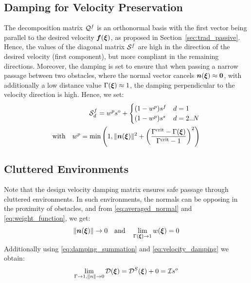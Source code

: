 \subsection{Damping for Velocity Preservation}
The decomposition matrix $\mathcal{Q}^{f}$ is an orthonormal basis with the first vector being parallel to the desired velocity $\boldsymbol{f}(\boldsymbol{\xi})$, as proposed in Section~\ref{sec:trad_passive}. Hence, the values of the diagonal matrix $\mathcal{S}^{f}$ are high in the direction of the desired velocity (first component), but more compliant in the remaining directions. 
Moreover, the damping is set to ensure that when passing a narrow passage between two obstacles, where the normal vector cancels $\boldsymbol{n}(\boldsymbol{\xi}) \approx \boldsymbol{0}$, with additionally a low distance value $\Gamma(\boldsymbol{\xi}) \approx 1$, the damping perpendicular to the velocity direction is high. Hence, we set:
\begin{equation}
  \begin{split}
  \matd{S}^{f}_{d} =
  w^p s^{\mathrm{o}} + 
  \begin{cases}
   (1- w^p) s^f & d = 1 \\
   (1- w^p) s^s & d = 2 .. N 
  \end{cases} \\
  \text{with} \quad
   w^p = \min \left(1,  \| \vecs n(\vecs \xi) \|^2 + \left(\frac{\Gamma^{\mathrm{crit}} -\Gamma(\vecs \xi)}{\Gamma^{\mathrm{crit}} - 1}\right) ^2 \right)
  \end{split}
  \label{eq:velocity_damping}
\end{equation}

\subsection{Cluttered Environments}
Note that the design velocity damping matrix ensures safe passage through cluttered environments. In such environments, the normals can be opposing in the proximity of obstacles, and from \eqref{eq:averaged_normal} and \eqref{eq:weight_function}, we get: 
\begin{equation}
    \| \boldsymbol{n}(\boldsymbol{\xi}) \| \rightarrow 0
    \quad \text{and} \quad
    \lim_{\Gamma (\boldsymbol{\xi}) \rightarrow 1} w (\boldsymbol{\xi}) = 0
\end{equation}
Additionally using \eqref{eq:damping_summation} and \eqref{eq:velocity_damping} we obtain:
\begin{equation}
    \lim_{\Gamma \rightarrow 1, \| n \| \rightarrow 0} \mathcal{D}(\boldsymbol{\xi}) 
    = \mathcal{D}^S(\boldsymbol{\xi}) + 0 
    =  \mathcal{I} s^o
\end{equation}

